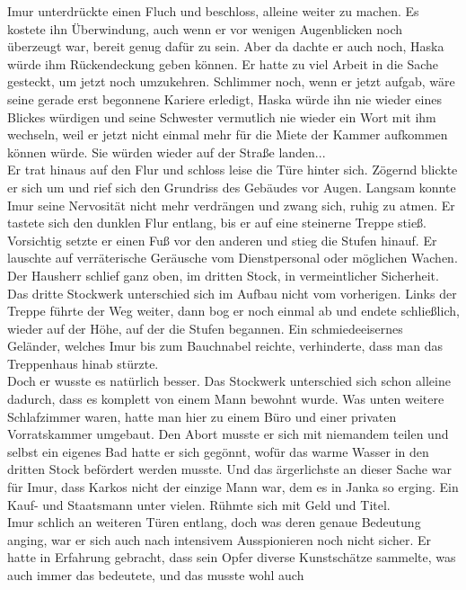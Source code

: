 Imur unterdrückte einen Fluch und beschloss, alleine weiter zu machen. Es kostete ihn Überwindung, 
auch wenn er vor wenigen Augenblicken noch überzeugt war, bereit genug dafür zu sein. Aber da 
dachte er auch noch, Haska würde ihm Rückendeckung geben können. Er hatte zu viel Arbeit in 
die Sache gesteckt, um jetzt noch umzukehren. Schlimmer noch, wenn er jetzt aufgab, wäre seine 
gerade erst begonnene Kariere erledigt, Haska würde ihn nie wieder eines Blickes würdigen und seine 
Schwester vermutlich nie wieder ein Wort mit ihm wechseln, weil er jetzt nicht einmal mehr für die 
Miete der Kammer aufkommen können würde. Sie würden wieder auf der Straße landen...\\
Er trat hinaus auf den Flur und schloss leise die Türe hinter sich. Zögernd blickte er sich um und 
rief sich den Grundriss des Gebäudes vor Augen. Langsam konnte Imur seine Nervosität nicht mehr 
verdrängen und zwang sich, ruhig zu atmen. Er tastete sich den dunklen Flur entlang, bis er auf 
eine steinerne Treppe stieß. Vorsichtig setzte er einen Fuß vor den anderen und stieg die Stufen 
hinauf. Er lauschte auf verräterische Geräusche vom Dienstpersonal oder möglichen Wachen. Der 
Hausherr schlief ganz oben, im dritten Stock, in vermeintlicher Sicherheit.\\
Das dritte Stockwerk unterschied sich im Aufbau nicht vom vorherigen. Links der Treppe führte 
der Weg weiter, dann bog er noch einmal ab und endete schließlich, wieder auf der Höhe, auf der die 
Stufen begannen. Ein schmiedeeisernes Geländer, welches Imur bis zum Bauchnabel reichte, 
verhinderte, dass man das Treppenhaus hinab stürzte.\\
Doch er wusste es natürlich besser. Das Stockwerk unterschied sich schon alleine dadurch, dass es 
komplett von einem Mann bewohnt wurde. Was unten weitere Schlafzimmer waren, hatte man hier zu 
einem Büro und einer privaten Vorratskammer umgebaut. Den Abort musste er sich mit niemandem teilen 
und selbst ein eigenes Bad hatte er sich gegönnt, wofür das warme Wasser in den dritten Stock 
befördert werden musste. Und das ärgerlichste an dieser Sache war für Imur, dass Karkos nicht 
der einzige Mann war, dem es in Janka so erging. Ein Kauf- und Staatsmann unter vielen. Rühmte 
sich mit Geld und Titel.\\
Imur schlich an weiteren Türen entlang, doch was deren genaue Bedeutung anging, war er sich 
auch nach intensivem Ausspionieren noch nicht sicher. Er hatte in Erfahrung gebracht, dass sein 
Opfer diverse Kunstschätze sammelte, was auch immer das bedeutete, und das musste wohl auch 
